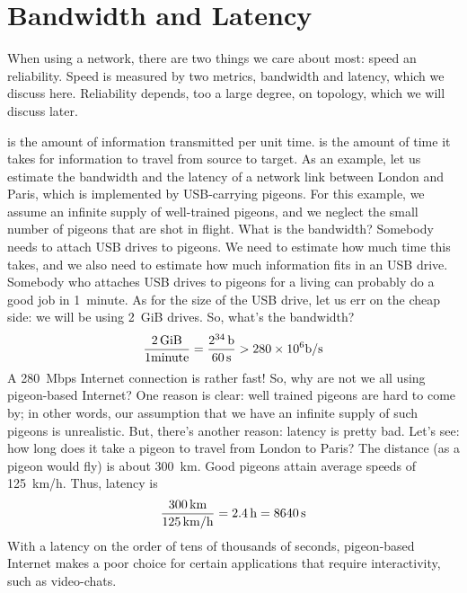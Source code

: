 


\section*{Bandwidth and Latency}

When using a network, there are two things we care about most: speed an reliability.
Speed is measured by two metrics, bandwidth and latency, which we discuss here.
Reliability depends, too a large degree, on topology, which we will discuss later.

 is the amount of information transmitted per unit time.
 is the amount of time it takes for information to travel
  from source to target.
As an example,
  let us estimate the bandwidth and the latency
  of a network link between London and Paris,
  which is implemented by USB-carrying pigeons.
For this example,
  we assume an infinite supply of well-trained pigeons,
  and we neglect the small number of pigeons that are shot in flight.
What is the bandwidth?
Somebody needs to attach USB drives to pigeons.
We need to estimate how much time this takes,
  and we also need to estimate how much information fits in an USB drive.
Somebody who attaches USB drives to pigeons for a living
  can probably do a good job in 1~minute.
As for the size of the USB drive,
  let us err on the cheap side: we will be using 2~GiB drives.
So, what's the bandwidth?
\[
\frac{2\,{\rm GiB}}{1\.{\rm minute}}
  = \frac{2^{34}\,{\rm b}}{60\,{\rm s}}
  > 280\times 10^6 {\rm b}/{\rm s}
\]
A 280~Mbps Internet connection is rather fast!
So, why are not we all using pigeon-based Internet?
One reason is clear: well trained pigeons are hard to come by;
  in other words,
  our assumption that we have an infinite supply of such pigeons is unrealistic.
But, there's another reason: latency is pretty bad.
Let's see: how long does it take a pigeon to travel from London to Paris?
The distance (as a pigeon would fly) is about 300~km.
Good pigeons attain average speeds of 125~km/h.
Thus, latency is
\[
\frac{300\,{\rm km}}{125\,{\rm km}/{\rm h}}
  = 2.4\,{\rm h} = 8640\,{\rm s}
\]
With a latency on the order of tens of thousands of seconds,
  pigeon-based Internet makes a poor choice for certain applications
  that require interactivity, such as video-chats.

